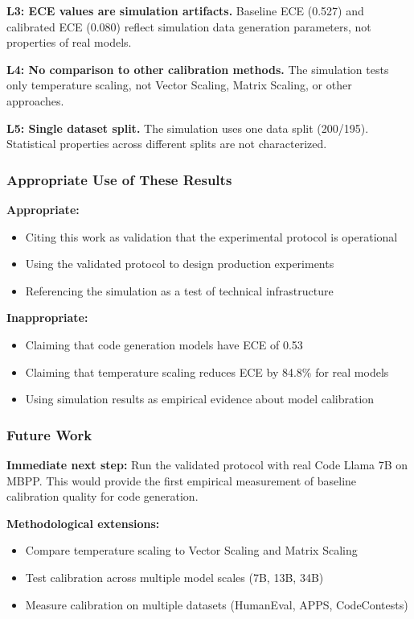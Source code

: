 \textbf{L3: ECE values are simulation artifacts.} Baseline ECE (0.527) and calibrated ECE (0.080) reflect simulation data generation parameters, not properties of real models.

\textbf{L4: No comparison to other calibration methods.} The simulation tests only temperature scaling, not Vector Scaling, Matrix Scaling, or other approaches.

\textbf{L5: Single dataset split.} The simulation uses one data split (200/195). Statistical properties across different splits are not characterized.

\subsubsection{Appropriate Use of These Results}

\textbf{Appropriate:}
\begin{itemize}
\item Citing this work as validation that the experimental protocol is operational
\item Using the validated protocol to design production experiments
\item Referencing the simulation as a test of technical infrastructure
\end{itemize}

\textbf{Inappropriate:}
\begin{itemize}
\item Claiming that code generation models have ECE of 0.53
\item Claiming that temperature scaling reduces ECE by 84.8\% for real models
\item Using simulation results as empirical evidence about model calibration
\end{itemize}

\subsubsection{Future Work}

\textbf{Immediate next step:} Run the validated protocol with real Code Llama 7B on MBPP. This would provide the first empirical measurement of baseline calibration quality for code generation.

\textbf{Methodological extensions:}
\begin{itemize}
\item Compare temperature scaling to Vector Scaling and Matrix Scaling
\item Test calibration across multiple model scales (7B, 13B, 34B)
\item Measure calibration on multiple datasets (HumanEval, APPS, CodeContests)
\end{itemize}

